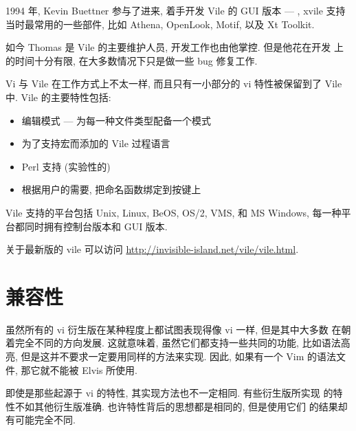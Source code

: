 1994 年, Kevin Buettner 参与了进来, 着手开发 Vile 的 GUI 版本 ---
, xvile 支持当时最常用的一些部件, 比如 Athena, OpenLook,
Motif, 以及 Xt Toolkit.

如今 Thomas 是 Vile 的主要维护人员, 开发工作也由他掌控. 但是他花在开发
上的时间十分有限, 在大多数情况下只是做一些 bug 修复工作.

Vi 与 Vile 在工作方式上不太一样, 而且只有一小部分的 vi 特性被保留到了
Vile 中. Vile 的主要特性包括:
\begin{itemize}
    \item 编辑模式 --- 为每一种文件类型配备一个模式
    \item 为了支持宏而添加的 Vile  过程语言
    \item Perl 支持 (实验性的)
    \item 根据用户的需要, 把命名函数绑定到按键上
\end{itemize}

Vile 支持的平台包括 Unix, Linux, BeOS, OS/2, VMS, 和 MS Windows,
每一种平台都同时拥有控制台版本和 GUI 版本.
\begin{warning}
    关于最新版的 vile 可以访问
    \url{http://invisible-island.net/vile/vile.html}.
\end{warning}

\section{兼容性}
\label{sec:compatibility}
虽然所有的 vi 衍生版在某种程度上都试图表现得像 vi 一样, 但是其中大多数
在朝着完全不同的方向发展. 这就意味着, 虽然它们都支持一些共同的功能,
比如语法高亮, 但是这并不要求一定要用同样的方法来实现. 因此, 如果有一个 
Vim 的语法文件, 那它就不能被 Elvis 所使用.

即使是那些起源于 vi 的特性, 其实现方法也不一定相同. 有些衍生版所实现
的特性不如其他衍生版准确. 也许特性背后的思想都是相同的, 但是使用它们
的结果却有可能完全不同.

